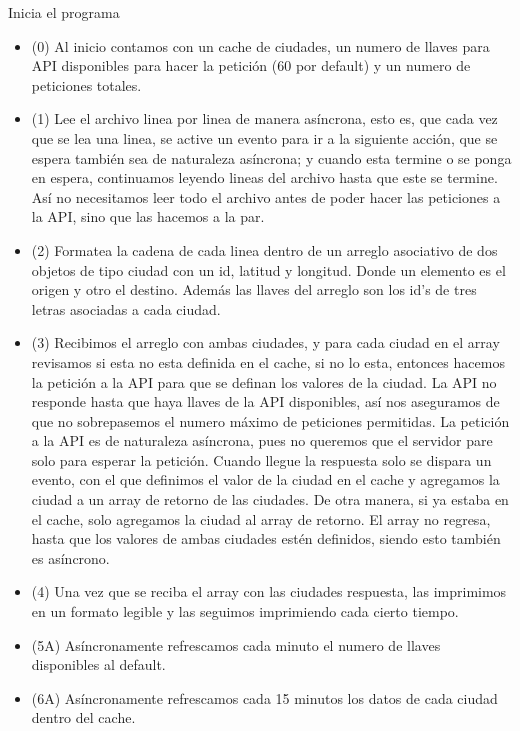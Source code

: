 \documentclass{report}
\begin{document}
    Inicia el programa
    \begin{itemize}
        \item (0) Al inicio contamos con un cache de ciudades, un numero de llaves para API disponibles para hacer la petición (60 por default) y un numero de peticiones totales.

        \item (1) Lee el archivo linea por linea de manera asíncrona, esto es, que cada vez que se lea una linea, se active un evento para ir a la siguiente acción, que se espera también sea de naturaleza asíncrona; y cuando esta termine o se ponga en espera, continuamos leyendo lineas del archivo hasta que este se termine. Así no necesitamos leer todo el archivo antes de poder hacer las peticiones a la API, sino que las hacemos a la par.

        \item (2) Formatea la cadena de cada linea dentro de un arreglo asociativo de dos objetos de tipo ciudad con un id, latitud y longitud. Donde un elemento es el origen y otro el destino. Además las llaves del arreglo son los id's de tres letras asociadas a cada ciudad.

        \item (3) Recibimos el arreglo con ambas ciudades, y para cada ciudad en el array revisamos si esta no esta definida en el cache, si no lo esta, entonces hacemos la petición a la API para que se definan los valores de la ciudad. La API no responde hasta que haya llaves de la API disponibles, así nos aseguramos de que no sobrepasemos el numero máximo de peticiones permitidas. La petición a la API es de naturaleza asíncrona, pues no queremos que el servidor pare solo para esperar la petición. Cuando llegue la respuesta solo se dispara un evento, con el que definimos el valor de la ciudad en el cache y agregamos la ciudad a un array de retorno de las ciudades.
        De otra manera, si ya estaba en el cache, solo agregamos la ciudad al array de retorno. El array no regresa, hasta que los valores de ambas ciudades estén definidos, siendo esto también es asíncrono.

        \item (4) Una vez que se reciba el array con las ciudades respuesta, las imprimimos en un formato legible y las seguimos imprimiendo cada cierto tiempo.

        \item (5A) Asíncronamente refrescamos cada minuto el numero de llaves disponibles al default.

        \item (6A) Asíncronamente refrescamos cada 15 minutos los datos de cada ciudad dentro del cache.
    \end{itemize}
\end{document}
